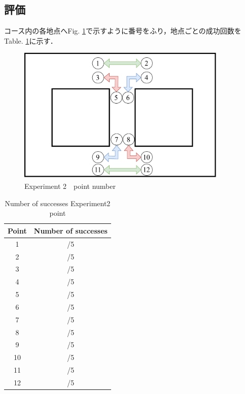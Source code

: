 \subsection{評価}
コース内の各地点へFig. \ref{fig::bunkiban}で示すように番号をふり，地点ごとの成功回数を
Table. \ref{tb::exp2suc}に示す．
\begin{figure}[h]
  \centering
  \includegraphics[width = 10cm]{./figs/bunkiban.pdf}
  \caption{Experiment 2　point number}
  \label{fig::bunkiban}
\end{figure}


\begin{table}[H]
  \centering
  \caption{Number of successes Experiment2 point}
  \begin{tabular}{|c|c|}
  \hline
  Point & Number of successes \\ \hline
  1     & /5                  \\ \hline
  2     & /5                  \\ \hline
  3     & /5                  \\ \hline
  4     & /5                  \\ \hline
  5     & /5                  \\ \hline
  6     & /5                  \\ \hline
  7     & /5                  \\ \hline
  8     & /5                  \\ \hline
  9     & /5                  \\ \hline
  10    & /5                  \\ \hline
  11    & /5                  \\ \hline
  12    & /5                  \\ \hline
  \end{tabular}
  
  \label{tb::exp2suc}
  \end{table}
  
